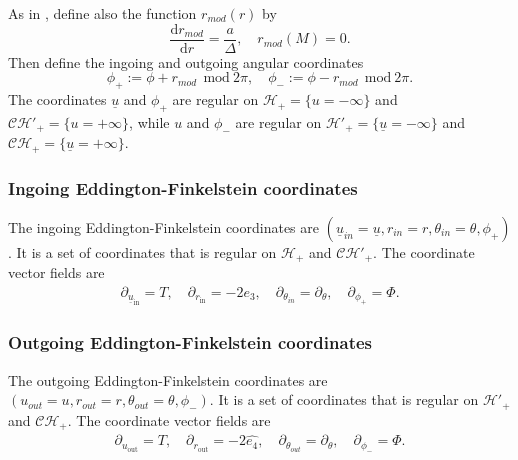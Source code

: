 \documentclass[reqno]{amsart}
\numberwithin{equation}{section}
\newcommand{\mch}{\mathcal{H}}
\newcommand{\ubar}{{\underline{u}}}
\newcommand{\dee}{\mathrm{d}}
\newcommand{\ch}{\mathcal{CH_+}}
\newcommand{\eqhat}{\widehat{e_4}}
\theoremstyle{plain}
\theoremstyle{definition}
\theoremstyle{remark}
\numberwithin{equation}{section}
\begin{document}
As in \cite{scalarMZ}, define also the function $r_{mod}(r)$ by
$$\frac{\dee r_{mod}}{\dee r}=\frac{a}{\Delta},\quad r_{mod}(M)=0.$$
Then define the {ingoing} and {outgoing} angular coordinates
$$\phi_{+}:=\phi+r_{mod}\:\:\text{mod}\:2\pi,\quad \phi_{-}:=\phi-r_{mod}\:\:\text{mod}\:2\pi.$$
The coordinates $\ubar$ and $\phi_+$ are regular on $\mch_+=\{u=-\infty\}$ and $\mathcal{CH}'_+=\{u=+\infty\}$, while $u$ and $\phi_-$ are regular on $\mch'_+=\{\ubar=-\infty\}$ and $\ch=\{\ubar=+\infty\}$.
\subsubsection{Ingoing Eddington-Finkelstein coordinates}
The ingoing Eddington-Finkelstein coordinates are $(\ubar_{in}=\ubar, r_{in}=r, \theta_{in}=\theta, \phi_{+})$. It is a set of coordinates that is regular on $\mch_+$ and $\mathcal{CH}'_+$. The coordinate vector fields are 
\begin{align}\label{eqn:coordEFin}
    \partial_{\ubar_\mathrm{in}}=T,\quad \partial_{r_\mathrm{in}}=-2e_3,\quad \partial_{\theta_{in}}=\partial_\theta,\quad \partial_{\phi_{+}}=\Phi.
\end{align}
\subsubsection{Outgoing Eddington-Finkelstein coordinates}
The outgoing Eddington-Finkelstein coordinates are $(u_{out}=u, r_{out}=r, \theta_{out}=\theta, \phi_{-})$. It is a set of coordinates that is regular on $\mch'_+$ and $\ch$. The coordinate vector fields are 
\begin{align}\label{eqn:coordEFout}
    \partial_{u_\mathrm{out}}=T,\quad \partial_{r_\mathrm{out}}=-2\eqhat,\quad \partial_{\theta_{out}}=\partial_\theta,\quad \partial_{\phi_{-}}=\Phi.
\end{align}
\end{document}
